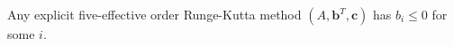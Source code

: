 \begin{theorem}\label{thm:RKSSP_fifth_effective_order}
    Any explicit five-effective order Runge-Kutta method $(A,\bm{b}^{T},\bm{c})$ has $b_{i} \leq 0$ for some $i$.
\end{theorem}
